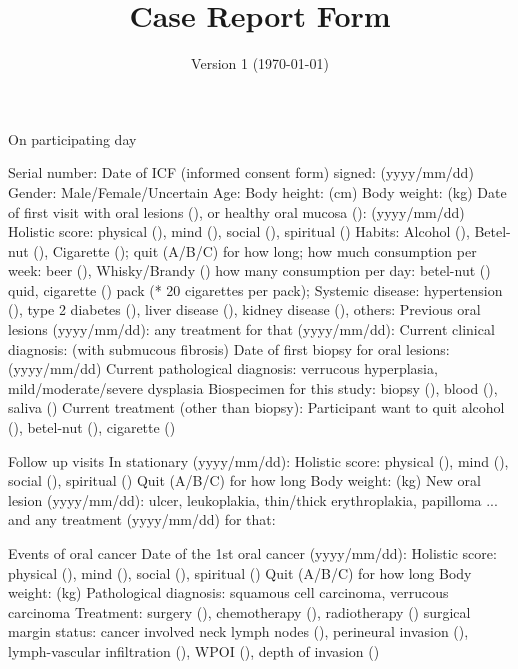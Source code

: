 \documentclass{article}
\title{Case Report Form}
\date{Version 1 (\today)}
\begin{document}
                          

\maketitle


\begin{outline}

\0 On participating day

\1 Serial number:
\1 Date of ICF (informed consent form) signed: (yyyy/mm/dd)
\1 Gender: Male/Female/Uncertain
\1 Age:
\1 Body height: (cm)
\1 Body weight: (kg)
\1 Date of first visit with oral lesions (), or healthy oral mucosa (): (yyyy/mm/dd)
    \2 Holistic score: physical (), mind (), social (), spiritual ()
    \2 Habits: Alcohol (), Betel-nut (), Cigarette ();
        \3 quit (A/B/C) for how long;
        \3 how much consumption per week: beer (), Whisky/Brandy ()
        \3 how many consumption per day: betel-nut () quid, cigarette () pack {\footnotesize (* 20 cigarettes per pack)};
\1 Systemic disease: hypertension (), type 2 diabetes (), liver disease (), kidney disease (), others:
\1 Previous oral lesions (yyyy/mm/dd):
    \2 any treatment for that (yyyy/mm/dd):
\1 Current clinical diagnosis: (with submucous fibrosis)
\1 Date of first biopsy for oral lesions: (yyyy/mm/dd)
\1 Current pathological diagnosis: verrucous hyperplasia, mild/moderate/severe dysplasia
    \1 Biospecimen for this study: biopsy (), blood (), saliva ()
\1 Current treatment (other than biopsy):
\1 Participant want to quit alcohol (), betel-nut (), cigarette ()

\vspace{10mm}

\0 Follow up visits
\1 In stationary (yyyy/mm/dd):
    \2 Holistic score: physical (), mind (), social (), spiritual ()
    \2 Quit (A/B/C) for how long
    \2 Body weight: (kg)
    \2 New oral lesion (yyyy/mm/dd): ulcer, leukoplakia, thin/thick erythroplakia, papilloma 
    \3 ... and any treatment (yyyy/mm/dd) for that:

\vspace{10mm}


\0 Events of oral cancer
\1 Date of the 1st oral cancer (yyyy/mm/dd):
    \2 Holistic score: physical (), mind (), social (), spiritual ()
    \2 Quit (A/B/C) for how long
    \2 Body weight: (kg)
    \2 Pathological diagnosis: squamous cell carcinoma, verrucous carcinoma 
    \2 Treatment: surgery (), chemotherapy (), radiotherapy ()
    \2 surgical margin status:
    \2 cancer involved neck lymph nodes (), perineural invasion (), lymph-vascular infiltration (), WPOI (), depth of invasion ()


\end{outline}
\end{document}
